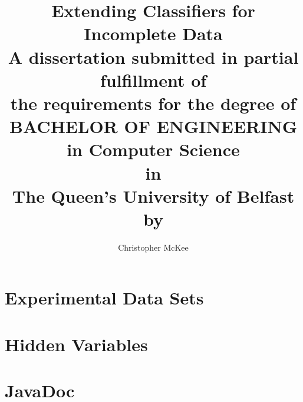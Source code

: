 \documentclass[12pt,a4paper]{report}
\begin{document}
\title{Extending Classifiers for Incomplete Data\\
\large
A dissertation submitted in partial fulfillment of\\
the requirements for the degree of\\
BACHELOR OF ENGINEERING in Computer Science\\
in\\
The Queen's University of Belfast\\
by
}
\author{Christopher McKee}
\maketitle
\newpage


\tableofcontents
\listoftables






\appendix
\chapter{Experimental Data Sets}
\label{datasets}

\chapter{Hidden Variables}
\label{hidden}

\chapter{JavaDoc}
\label{JavaDoc}

\end{document}
